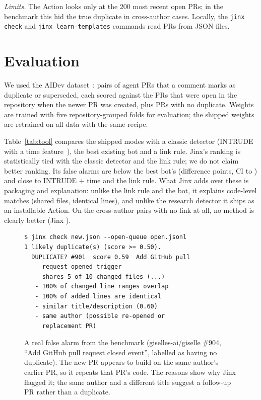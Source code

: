\documentclass[sigconf]{acmart}
\begin{document}
\emph{Limits.} The Action looks only at the 200 most recent open PRs; in the benchmark this hid the true duplicate in \capCross{} cross-author cases. Locally, the \texttt{jinx check} and \texttt{jinx learn-templates} commands read PRs from JSON files.

\section{Evaluation}
\begin{table}[t]\centering\caption{Cross-author duplicate pairs on open-only queues ($n=\nCross$, historical AIDev data~\cite{jinxstudy}). Flagged: true duplicate ranked first and above the method's threshold. False alarms on \nNeg{} PRs without a duplicate, 95\% CIs.}\label{tab:tool}
\footnotesize\setlength{\tabcolsep}{3pt}\end{table}

We used the AIDev dataset~\cite{li2026aidev}: \nPairs{} pairs of agent PRs that a comment marks as duplicate or superseded, each scored against the PRs that were open in the repository when the newer PR was created, plus \nNeg{} PRs with no duplicate. Weights are trained with five repository-grouped folds for evaluation; the shipped weights are retrained on all data with the same recipe.

Table~\ref{tab:tool} compares the shipped modes with a classic detector (INTRUDE~\cite{ren2019intrude} with a time feature~\cite{wang2019time}), the best existing bot and a link rule. Jinx's ranking is statistically tied with the classic detector and the link rule; we do not claim better ranking. Its false alarms are below the best bot's (difference \dFARcg{} points, CI \dFARcgLo{} to \dFARcgHi) and close to INTRUDE + time and the link rule. What Jinx adds over these is packaging and explanation: unlike the link rule and the bot, it explains code-level matches (shared files, identical lines), and unlike the research detector it ships as an installable Action. On the \nNoLink{} cross-author pairs with no link at all, no method is clearly better (Jinx \ROnejinxNoLink).

\begin{figure}[t]
\small
\begin{verbatim}
$ jinx check new.json --open-queue open.jsonl
1 likely duplicate(s) (score >= 0.50).
  DUPLICATE? #901  score 0.59  Add GitHub pull
     request opened trigger
   - shares 5 of 10 changed files (...)
   - 100% of changed line ranges overlap
   - 100% of added lines are identical
   - similar title/description (0.60)
   - same author (possible re-opened or
     replacement PR)
\end{verbatim}
\caption{A real false alarm from the benchmark (giselles-ai/giselle \#904, ``Add GitHub pull request closed event'', labelled as having no duplicate). The new PR appears to build on the same author's earlier PR, so it repeats that PR's code. The reasons show why Jinx flagged it; the same author and a different title suggest a follow-up PR rather than a duplicate.}\label{fig:fa}\end{figure}
\end{document}
